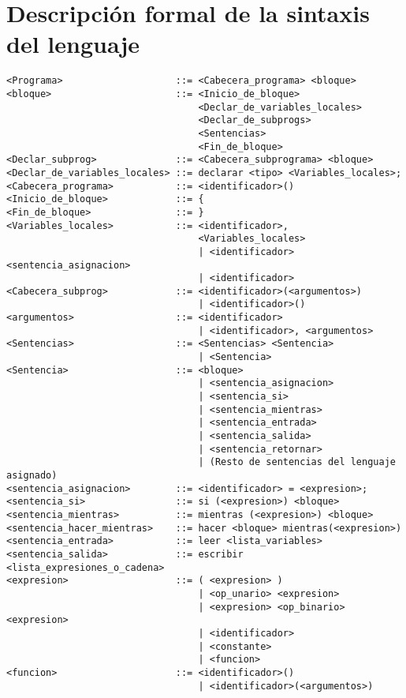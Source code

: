 \section{Descripción formal de la sintaxis del lenguaje}

\begin{verbatim}
<Programa>                    ::= <Cabecera_programa> <bloque>
<bloque>                      ::= <Inicio_de_bloque>
                                  <Declar_de_variables_locales>
                                  <Declar_de_subprogs>
                                  <Sentencias>
                                  <Fin_de_bloque>
<Declar_subprog>              ::= <Cabecera_subprograma> <bloque>
<Declar_de_variables_locales> ::= declarar <tipo> <Variables_locales>;
<Cabecera_programa>           ::= <identificador>()
<Inicio_de_bloque>            ::= {
<Fin_de_bloque>               ::= }
<Variables_locales>           ::= <identificador>,
                                  <Variables_locales>
                                  | <identificador> <sentencia_asignacion>
                                  | <identificador>
<Cabecera_subprog>            ::= <identificador>(<argumentos>)
                                  | <identificador>()
<argumentos>                  ::= <identificador>
                                  | <identificador>, <argumentos>
<Sentencias>                  ::= <Sentencias> <Sentencia>
                                  | <Sentencia>
<Sentencia>                   ::= <bloque>
                                  | <sentencia_asignacion>
                                  | <sentencia_si>
                                  | <sentencia_mientras>
                                  | <sentencia_entrada>
                                  | <sentencia_salida>
                                  | <sentencia_retornar>
                                  | (Resto de sentencias del lenguaje asignado)
<sentencia_asignacion>        ::= <identificador> = <expresion>;
<sentencia_si>                ::= si (<expresion>) <bloque>
<sentencia_mientras>          ::= mientras (<expresion>) <bloque>
<sentencia_hacer_mientras>    ::= hacer <bloque> mientras(<expresion>)
<sentencia_entrada>           ::= leer <lista_variables>
<sentencia_salida>            ::= escribir <lista_expresiones_o_cadena>
<expresion>                   ::= ( <expresion> )
                                  | <op_unario> <expresion>
                                  | <expresion> <op_binario> <expresion>
                                  | <identificador>
                                  | <constante>
                                  | <funcion>
<funcion>                     ::= <identificador>()
                                  | <identificador>(<argumentos>)

\end{verbatim}


